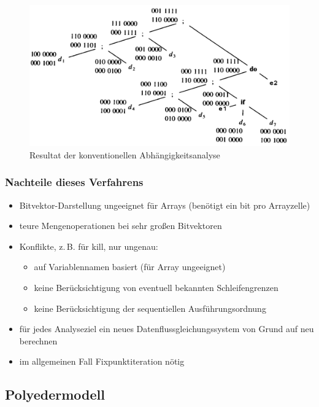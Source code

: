 \begin{figure}[p]
  \centering
  \includegraphics[scale=0.2]{images/bild2-1.png}
  \caption{Resultat der konventionellen Abhängigkeitsanalyse}
  \label{fig:resultat}
\end{figure}

\subsubsection{Nachteile dieses Verfahrens}
\label{ssub:nachteile_dieses_verfahrens}

\begin{itemize}
  \item Bitvektor-Darstellung ungeeignet für Arrays (benötigt ein bit pro Arrayzelle)
  \item teure Mengenoperationen bei sehr großen Bitvektoren
  \item Konflikte, z.\,B. für kill, nur ungenau:
    \begin{itemize}
    \item auf Variablennamen basiert (für Array ungeeignet)
    \item keine Berücksichtigung von eventuell bekannten Schleifengrenzen
    \item keine Berücksichtigung der sequentiellen Ausführungsordnung
    \end{itemize}
  \item für jedes Analyseziel ein neues Datenflussgleichungssystem von Grund auf neu berechnen
  \item im allgemeinen Fall Fixpunktiteration nötig
\end{itemize}

\subsection{Polyedermodell}

